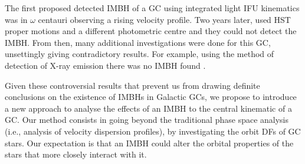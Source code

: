 \par The first proposed detected \ac{IMBH} of a \ac{GC}  using integrated light IFU kinematics was in \(\omega\) centauri \citep{2008ApJ...676.1008N} observing a rising velocity profile. Two years later, \citet{2010ApJ...710.1063V} used \ac{HST} proper motions and a different photometric centre and they could not detect the \ac{IMBH}. From then, many additional investigations were done for this \ac{GC}, unsettingly giving contradictory results. For example, using the method of detection of X-ray emission there was no \ac{IMBH} found \citep{2015A&A...581A...1L}.
\par Given these controversial results that prevent us from drawing definite conclusions on the existence of \acp{IMBH} in Galactic \acp{GC}, we propose to introduce a new approach to analyse the effects of an \ac{IMBH} to the central kinematic of a \ac{GC}. Our method consists in going beyond the traditional phase space analysis (i.e., analysis of velocity dispersion profiles), by investigating the orbit \acp{DF} of \ac{GC} stars. Our expectation is that an \ac{IMBH} could alter the orbital properties of the stars that more closely interact with it.
\\

